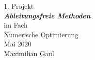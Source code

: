 \documentclass[a4paper, 12pt]{report}
\begin{document}
\begin{center}
    \vspace*{2em}
    \normalsize 1. Projekt\\
    \vspace*{1em}
    \normalsize \textbf{\textit{Ableitungsfreie Methoden}}\\
    \vspace*{4em}
    \normalsize im Fach\\
    \vspace*{1em}
    \large Numerische Optimierung\\
    \vspace*{30em}
    \normalsize Mai 2020\\
    \vspace*{1em}
    \normalsize Maximilian Gaul
\end{center}

\thispagestyle{empty}

\newpage
\end{document}
